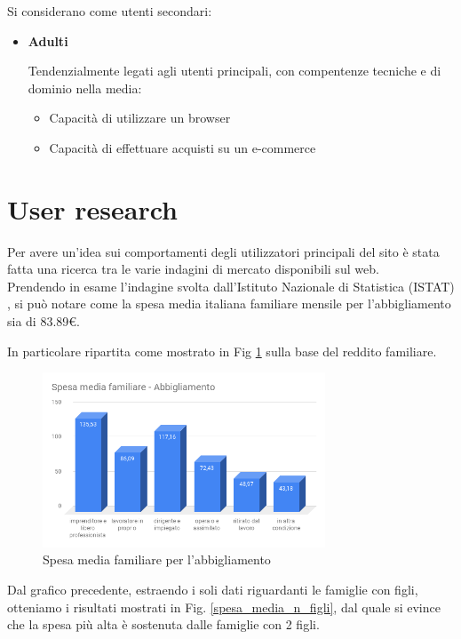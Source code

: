 \documentclass[12pt,italian,]{report}
\providecommand{\tightlist}{%
  \setlength{\itemsep}{0pt}\setlength{\parskip}{0pt}}
\begin{document}
Si considerano come utenti secondari:

\begin{itemize}
\item
  \textbf{Adulti}

  Tendenzialmente legati agli utenti principali, con compentenze
  tecniche e di dominio nella media:

  \begin{itemize}
  \tightlist
  \item
    Capacità di utilizzare un browser
  \item
    Capacità di effettuare acquisti su un e-commerce
  \end{itemize}
\end{itemize}

\hypertarget{user-research}{%
\section{User research}\label{user-research}}

Per avere un'idea sui comportamenti degli utilizzatori principali del
sito è stata fatta una ricerca tra le varie indagini
di mercato disponibili sul web.
\\
Prendendo in esame l'indagine 
svolta dall'Istituto Nazionale di Statistica (ISTAT) \cite{istat}, si può notare come la spesa media italiana familiare mensile per l'abbigliamento sia di 83.89€.

In particolare ripartita come mostrato in Fig \ref{spesa_media_fam} sulla base del reddito familiare.

\begin{figure}[h]
\centering
\includegraphics[width=0.75\textwidth]{img/Spesa_media_familiare_abbigliamento.png}
\caption{Spesa media familiare per l'abbigliamento}
\label{spesa_media_fam}
\end{figure}

Dal grafico precedente, estraendo i soli dati riguardanti le famiglie con figli, otteniamo i risultati mostrati in Fig. \ref{spesa_media_n_figli}, dal quale si evince che la spesa più alta è sostenuta dalle famiglie con 2 figli.
\end{document}
